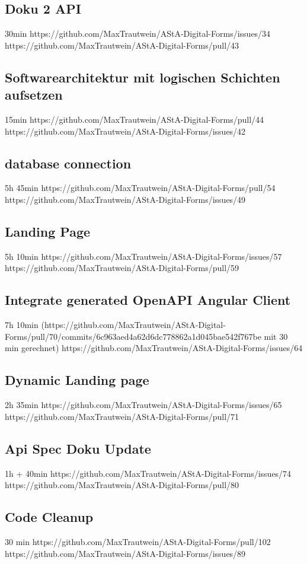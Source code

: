 \subsection{Doku 2 API}
30min
https://github.com/MaxTrautwein/AStA-Digital-Forms/issues/34
https://github.com/MaxTrautwein/AStA-Digital-Forms/pull/43

\subsection{Softwarearchitektur mit logischen Schichten aufsetzen }
15min
https://github.com/MaxTrautwein/AStA-Digital-Forms/pull/44
https://github.com/MaxTrautwein/AStA-Digital-Forms/issues/42
\subsection{database connection}
5h 45min
https://github.com/MaxTrautwein/AStA-Digital-Forms/pull/54
https://github.com/MaxTrautwein/AStA-Digital-Forms/issues/49
\subsection{Landing Page}
5h 10min
https://github.com/MaxTrautwein/AStA-Digital-Forms/issues/57
https://github.com/MaxTrautwein/AStA-Digital-Forms/pull/59
\subsection{Integrate generated OpenAPI Angular Client}
7h 10min
(https://github.com/MaxTrautwein/AStA-Digital-Forms/pull/70/commits/6c963aed4a62d6dc778862a1d045bae542f767be mit 30 min gerechnet)
https://github.com/MaxTrautwein/AStA-Digital-Forms/issues/64
\subsection{Dynamic Landing page}
2h 35min
https://github.com/MaxTrautwein/AStA-Digital-Forms/issues/65
https://github.com/MaxTrautwein/AStA-Digital-Forms/pull/71
\subsection{Api Spec Doku Update}
1h + 40min
https://github.com/MaxTrautwein/AStA-Digital-Forms/issues/74
https://github.com/MaxTrautwein/AStA-Digital-Forms/pull/80
\subsection{Code Cleanup}
30 min
https://github.com/MaxTrautwein/AStA-Digital-Forms/pull/102
https://github.com/MaxTrautwein/AStA-Digital-Forms/issues/89
